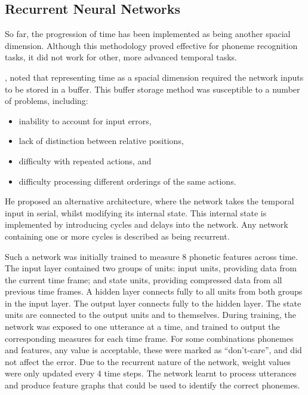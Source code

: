 \subsection{Recurrent Neural Networks}

So far, the progression of time has been implemented as being another spacial
dimension.
Although this methodology proved effective for phoneme recognition tasks, it did
not work for other, more advanced temporal tasks.



\cite{Jordan:1986:Serial}, noted that representing time as a spacial dimension
required the network inputs to be stored in a buffer.
This buffer storage method was susceptible to a number of problems, including:
\begin{itemize}
    \item inability to account for input errors,
    \item lack of distinction between relative positions,
    \item difficulty with repeated actions, and
    \item difficulty processing different orderings of the same actions.
\end{itemize}
He proposed an alternative architecture, where the network takes the temporal
input in serial, whilst modifying its internal state.
This internal state is implemented by introducing cycles and delays into the
network.
Any network containing one or more cycles is described as being recurrent.

Such a network was initially trained to measure 8 phonetic features across time.
The input layer contained two groups of units:
input units, providing data from the current time frame;
and state units, providing compressed data from all previous time frames.
A hidden layer connects fully to all units from both groups in the input layer.
The output layer connects fully to the hidden layer.
The state units are connected to the output units and to themselves.
During training, the network was exposed to one utterance at a time, and trained
to output the corresponding measures for each time frame.
For some combinations phonemes and features, any value is acceptable, these were
marked as ``don't-care'', and did not affect the error.
Due to the recurrent nature of the network, weight values were only updated
every 4 time steps.
The network learnt to process utterances and produce feature graphs that could
be used to identify the correct phonemes.




